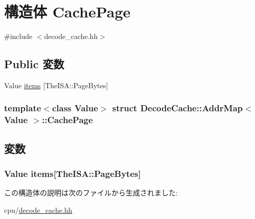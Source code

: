 \hypertarget{structDecodeCache_1_1AddrMap_1_1CachePage}{
\section{構造体 CachePage}
\label{structDecodeCache_1_1AddrMap_1_1CachePage}
}


{\ttfamily \#include $<$decode\_\-cache.hh$>$}\subsection*{Public 変数}
\begin{DoxyCompactItemize}
\item 
Value \hyperlink{structDecodeCache_1_1AddrMap_1_1CachePage_a5c3a98c50b0da4daf95024116afbc409}{items} \mbox{[}TheISA::PageBytes\mbox{]}
\end{DoxyCompactItemize}
\subsubsection*{template$<$class Value$>$ struct DecodeCache::AddrMap$<$ Value $>$::CachePage}



\subsection{変数}
\hypertarget{structDecodeCache_1_1AddrMap_1_1CachePage_a5c3a98c50b0da4daf95024116afbc409}{
\subsubsection[{items}]{\setlength{\rightskip}{0pt plus 5cm}Value {\bf items}\mbox{[}TheISA::PageBytes\mbox{]}}}
\label{structDecodeCache_1_1AddrMap_1_1CachePage_a5c3a98c50b0da4daf95024116afbc409}


この構造体の説明は次のファイルから生成されました:\begin{DoxyCompactItemize}
\item 
cpu/\hyperlink{cpu_2decode__cache_8hh}{decode\_\-cache.hh}\end{DoxyCompactItemize}
